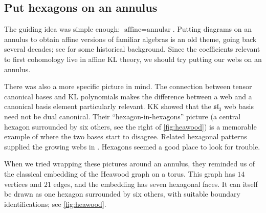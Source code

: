 \documentclass[a4paper,11pt]{amsart}
\numberwithin{equation}{subsection}
\theoremstyle{plain}
\theoremstyle{definition}
\theoremstyle{remark}
\begin{document}
\subsection{Put hexagons on an annulus}

The guiding idea was simple enough:
$\text{affine}=\text{annular}$.
Putting diagrams on an annulus to obtain affine versions of
familiar algebras is an old theme, going back several decades;
see \cite[Section~1B]{HT} for some historical background.
Since the coefficients relevant to first cohomology live
in affine KL theory, we should try putting our webs on
an annulus.

There was also a more specific picture in mind.
The connection between tensor canonical bases and KL
polynomials \cite{FKK} makes the difference between a web
and a canonical basis element particularly relevant.
KK \cite{KK99} showed that the
$\mathfrak{sl}_3$ web basis need not be dual canonical.
Their ``hexagon-in-hexagons'' picture (a central hexagon
surrounded by six others, see the 
right of \autoref{fig:heawood}) is a memorable example of where
the two bases start to disagree.
Related hexagonal patterns supplied the growing webs in
\cite{Finite}. Hexagons seemed a good place to look for trouble.

When we tried wrapping these pictures around an annulus,
they reminded us of the classical embedding of the Heawood
graph on a torus. This graph has $14$ vertices and $21$ edges,
and the embedding has seven hexagonal faces.
It can itself be drawn as one hexagon surrounded by six
others, with suitable boundary identifications;
see \autoref{fig:heawood}.
\end{document}
